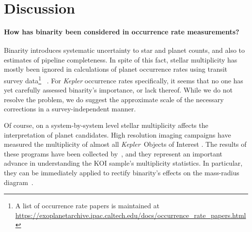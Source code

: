 \section{Discussion}
\label{sec:discussion}

\paragraph{How has binarity been considered in occurrence rate measurements?}
Binarity introduces systematic uncertainty to star and planet counts, and also 
to estimates of pipeline completeness.
In spite of this fact, stellar multiplicity has mostly been ignored in 
calculations of planet occurrence rates using transit survey data\footnote{
    A list of occurrence rate papers is maintained at 
    \url{https://exoplanetarchive.ipac.caltech.edu/docs/occurrence_rate_papers.html}
}~
\citep[\textit{e.g.},][]{howard_planet_2012,fressin_false_2013,foreman-mackey_exoplanet_2014,dressing_occurrence_2015,burke_terrestrial_2015}.
For {\it Kepler} occurrence rates specifically, it seems that no one has yet 
carefully assessed binarity's importance, or lack thereof.
While we do not resolve the problem, we do suggest
the approximate scale of the necessary corrections in a survey-independent 
manner.

Of course, on a system-by-system level stellar multiplicity affects the 
interpretation of planet candidates. High resolution imaging 
campaigns have measured the multiplicity of almost all {\it Kepler}\ Objects 
of Interest 
\citep{howell_speckle_2011,adams_adaptive_2012,adams_adaptive_2013,horch_observations_2012,
    horch_most_2014,lillo-box_multiplicity_2012,lillo-box_high-resolution_2014,dressing_adaptive_2014,
    law_robotic_2014,cartier_revision_2015,everett_high-resolution_2015,gilliland_hubble_2015,
    wang_influence_2015,wang_influence_2015-1,baranec_robo-ao_2016}.
The results of these programs have been collected 
by~\citet{furlan_kepler_2017}, and they represent an important advance in 
understanding the KOI 
sample's multiplicity statistics.
In particular, they can be immediately applied to rectify binarity's effects 
on the mass-radius diagram~\citep{furlan_densities_2017}.

